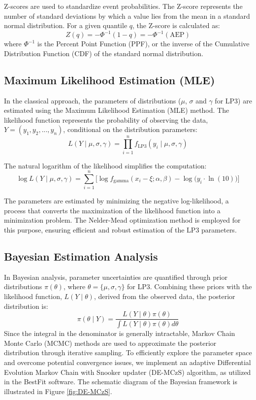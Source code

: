 Z-scores are used to standardize event probabilities. The Z-score represents the number of standard deviations by which a value lies from the mean in a standard normal distribution. For a given quantile $q$, the Z-score is calculated as:
$$Z(q) = -\Phi^{-1}(1-q) = -\Phi^{-1}(\text{AEP})$$
where $\Phi^{-1}$ is the Percent Point Function (PPF), or the inverse of the Cumulative Distribution Function (CDF) of the standard normal distribution.

\subsection{Maximum Likelihood Estimation (MLE)}
In the classical approach, the parameters of distributions ($\mu$, $\sigma$ and $\gamma$ for LP3) are estimated using the Maximum Likelihood Estimation (MLE) method. The likelihood function represents the probability of observing the data, $Y =(y_1, y_2,..., y_n)$, conditional on the distribution parameters: 
$$L (Y \mid \mu, \sigma, \gamma) =\prod_{i=1}^n f_{\text{LP3}} (y_i \mid \mu, \sigma, \gamma)$$

The natural logarithm of the likelihood simplifies the computation: 
$$\log L (Y \mid \mu, \sigma, \gamma) =\sum_{i=1}^n \big[\log f_{\text{gamma}} (x_i - \xi; \alpha, \beta) - \log \big(y_i \cdot \ln(10) \big) \big]$$

The parameters are estimated by minimizing the negative log-likelihood, a process that converts the maximization of the likelihood function into a minimization problem. The Nelder-Mead optimization method is employed for this purpose, ensuring efficient and robust estimation of the LP3 parameters.

\subsection{Bayesian Estimation Analysis}
In Bayesian analysis, parameter uncertainties are quantified through prior distributions  $\pi(\theta)$, where $\theta = \{\mu, \sigma, \gamma\}$ for LP3. Combining these priors with the likelihood function, $L (Y \mid \theta)$, derived from the observed data, the posterior distribution is:
$$ \pi (\theta \mid Y) = \frac{L (Y \mid \theta) \pi(\theta)}{\int L (Y \mid \theta) \pi(\theta) d\theta}$$
Since the integral in the denominator is generally intractable, Markov Chain Monte Carlo (MCMC) methods are used to approximate the posterior distribution through iterative sampling. To efficiently explore the parameter space and overcome potential convergence issues, we implement an adaptive Differential Evolution Markov Chain with Snooker updater (DE-MCzS) algorithm, as utilized in the BestFit software. The schematic diagram of the Bayesian framework is illustrated in Figure \ref{fig:DE-MCzS}. 

